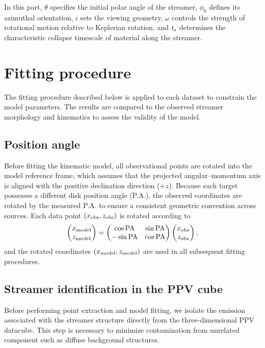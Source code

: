 In this part, $\theta$ specifies the initial polar angle of the streamer, $\phi_0$ defines its azimuthal orientation, $i$ sets the viewing geometry, $\omega$ controls the strength of rotational motion relative to Keplerian rotation, and $t_{\rm s}$ determines the characteristic collapse timescale of material along the streamer.

\section{Fitting procedure}\label{sec:fitting_procedure}
The fitting procedure described below is applied to each dataset to constrain the model parameters. The results are compared to the observed streamer morphology and kinematics to assess the validity of the model.

\subsection{Position angle}\label{sec:position_angle}
Before fitting the kinematic model, all observational points are rotated into the model reference frame, which assumes that the projected angular--momentum axis is aligned with the positive declination direction ($+z$). Because each target possesses a different disk position angle (P.A.), the observed coordinates are rotated by the measured P.A. to ensure a consistent geometric convention across sources. Each data point $(x_{\rm obs}, z_{\rm obs})$ is rotated according to
\[
\begin{pmatrix}
x_{\rm model} \\
z_{\rm model}
\end{pmatrix}
=
\begin{pmatrix}
\cos{\rm PA} & \sin{\rm PA} \\
-\sin{\rm PA} & \cos{\rm PA}
\end{pmatrix}
\begin{pmatrix}
x_{\rm obs} \\
z_{\rm obs}
\end{pmatrix},
\]
and the rotated coordinates $(x_{\rm model}, z_{\rm model})$ are used in all subsequent fitting procedures.

\subsection{Streamer identification in the PPV cube}

Before performing point extraction and model fitting, we isolate the emission associated with the streamer structure directly from the three-dimensional PPV datacube. This step is necessary to minimize contamination from unrelated component such as diffuse background structures.

